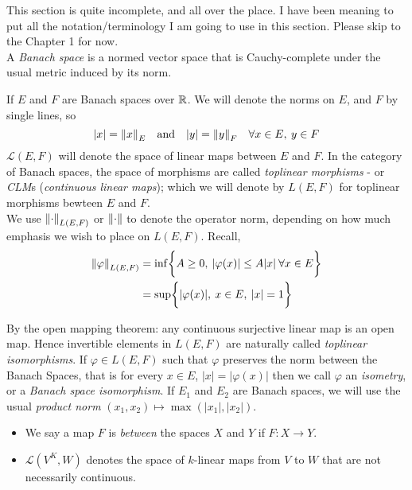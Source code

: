 \documentclass[../main-manifolds.tex]{subfiles}
\begin{document}
\newpage
{}
This section is quite incomplete, and all over the place. I have been meaning to put all the notation/terminology I am going to use in this section. Please skip to the Chapter 1 for now.\\

%
A \emph{Banach space} is a normed vector space that is Cauchy-complete under the usual metric induced by its norm. 

If $E$ and $F$ are Banach spaces over $\mathbb{R}$. We will denote the norms on $E$, and $F$ by single lines, so 
\[
    \vert x\vert = \norm{x}_E\qqtext{and} \vert y\vert = \norm{y}_F\quad\forall x\in E,\: y\in F
\]
$\mathcal{L}(E,F)$ will denote the space of linear maps between $E$ and $F$. In the category of Banach spaces, the space of morphisms are called \emph{toplinear morphisms} - or \emph{CLM}s (\emph{continuous linear maps}); which we will denote by $L(E,F)$ for toplinear morphisms bewteen $E$ and $F$. \\


We use $\norm{\cdot}_{L(E,F)}$ or $\norm{\cdot}$ to denote the operator norm, depending on how much emphasis we wish to place on $L(E,F)$. Recall,
\begin{align*}
\norm{\varphi}_{L(E,F)} &= \inf\biggl\{{A\geq 0,\: \vert\varphi(x)\vert\leq A\vert x\vert\:\forall x\in E}\biggr\}\\
&= \sup\biggl\{{\vert\varphi(x)\vert,\: x\in E,\: \vert x\vert=1}\biggr\}
\end{align*}


By the open mapping theorem: any continuous surjective linear map is an open map. Hence invertible elements in $L(E,F)$ are naturally called \emph{toplinear isomorphisms}. If $\varphi\in L(E,F)$ such that $\varphi$ preserves the norm between the Banach Spaces, that is for every $x\in E$, $\vert x\vert = \vert \varphi(x)\vert$ then we call $\varphi$ an \emph{isometry}, or a \emph{Banach space isomorphism}. If $E_1$ and $E_2$ are Banach spaces, we will use the usual \emph{product norm} $(x_1, x_2)\mapsto \max(\vert x_1\vert,\vert x_2\vert)$. 

\begin{itemize}
    \item We say a map $F$ is \emph{between} the spaces $X$ and $Y$ if $F: X\to Y$. 
    \item $\mathcal{L}(V^K,W)$ denotes the space of $k$-linear maps from $V$ to $W$ that are not necessarily continuous. 
\end{itemize}
%
\end{document}
